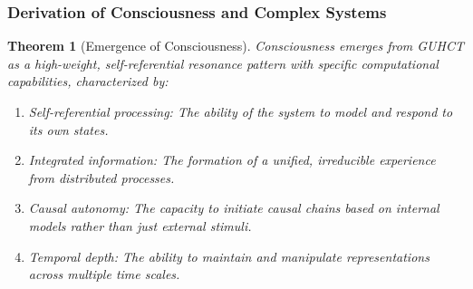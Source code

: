 \documentclass[11pt,a4paper]{article}
\newtheorem{theorem}{Theorem}[section]
\begin{document}
\subsubsection{Derivation of Consciousness and Complex Systems}
\label{ssubsec:consciousness_derivation_axioms} %

\begin{theorem}[Emergence of Consciousness]
\label{thm:consciousness_emergence_axioms_thm} %
Consciousness emerges from GUHCT as a high-weight, self-referential resonance pattern with specific computational capabilities, characterized by:
\begin{enumerate}
    \item Self-referential processing: The ability of the system to model and respond to its own states.
    \item Integrated information: The formation of a unified, irreducible experience from distributed processes.
    \item Causal autonomy: The capacity to initiate causal chains based on internal models rather than just external stimuli.
    \item Temporal depth: The ability to maintain and manipulate representations across multiple time scales.
\end{enumerate}
\end{theorem}
\end{document}
